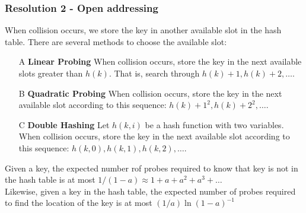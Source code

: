 \documentclass[a4paper]{article}
\begin{document}
\subsubsection{Resolution 2 - Open addressing}
When collision occurs, we store the key in another available slot in the hash table. There are several methods to choose the available slot:
\begin{itemize}
	\item[A] \textbf{Linear Probing} When collision occurs, store the key in the next available slots greater than $h(k)$. That is, search through $h(k)+1, h(k)+2, \dots$.
	\item[B] \textbf{Quadratic Probing} When collision occurs, store the key in the next available slot according to this sequence: $h(k)+1^2, h(k)+2^2, \dots$.
	\item[C] \textbf{Double Hashing}
	Let $h(k, i)$ be a hash function with two variables. When collision occurs, store the key in the next available slot according to this sequence: $h(k, 0), h(k, 1), h(k, 2), \dots$.
\end{itemize}
Given a key, the expected number rof probes required to know that key is not in the hash table is at most $1/(1-a) \approx 1 + a + a^2 + a^3 + \dots$\\
Likewise, given a key in the hash table, the expected number of probes required to find the location of the key is at most $(1/a) \ln(1-a)^{-1}$

\appendix
\end{document}
